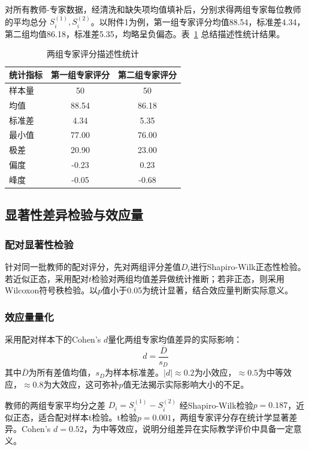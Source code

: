 对所有教师-专家数据，经清洗和缺失项均值填补后，分别求得两组专家每位教师的平均总分 $S^{(1)}_i, S^{(2)}_i$。以附件1为例，第一组专家评分均值88.54，标准差4.34，第二组均值86.18，标准差5.35，均略呈负偏态。表~\ref{tab:descstat} 总结描述性统计结果。



\begin{table}[h]
\centering
\caption{两组专家评分描述性统计}
\label{tab:descstat}
\begin{tabular}{lcc}
\toprule
统计指标 & 第一组专家评分 & 第二组专家评分 \\
\midrule
样本量      & 50        & 50        \\
均值        & 88.54     & 86.18     \\
标准差      & 4.34      & 5.35      \\
最小值      & 77.00     & 76.00     \\
极差        & 20.90     & 23.00     \\
偏度        & -0.23     & 0.23      \\
峰度        & -0.05     & -0.68     \\
\bottomrule
\end{tabular}
\end{table}

\subsection{显著性差异检验与效应量}
\subsubsection{配对显著性检验}
针对同一批教师的配对评分，先对两组评分差值$D_i$进行Shapiro-Wilk正态性检验。若近似正态，采用配对$t$检验对两组均值差异做统计推断；若非正态，则采用Wilcoxon符号秩检验。以$p$值小于0.05为统计显著，结合效应量判断实际意义。

\subsubsection{效应量量化}
采用配对样本下的Cohen's $d$量化两组专家均值差异的实际影响：
\[
d = \frac{\overline{D}}{s_D}
\]
其中$\overline{D}$为所有差值均值，$s_D$为样本标准差。$|d| \approx 0.2$为小效应，$\approx 0.5$为中等效应，$\approx 0.8$为大效应，这可弥补$p$值无法揭示实际影响大小的不足。

教师的两组专家平均分之差 $D_i = S^{(1)}_i - S^{(2)}_i$ 经Shapiro-Wilk检验$p=0.187$，近似正态，适合配对样本t检验。t检验$p=0.001$，两组专家评分存在统计学显著差异。Cohen's $d=0.52$，为中等效应，说明分组差异在实际教学评价中具备一定意义。

